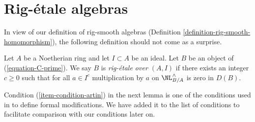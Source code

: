 \section{Rig-\'etale algebras}
\label{section-rig-etale}

\noindent
In view of our definition of rig-smooth algebras
(Definition \ref{definition-rig-smooth-homomorphism}),
the following definition should not come as a surprise.

\begin{definition}
\label{definition-rig-etale-homomorphism}
Let $A$ be a Noetherian ring and let $I \subset A$ be an ideal.
Let $B$ be an object of (\ref{equation-C-prime}). We say
$B$ is {\it rig-\'etale over $(A, I)$} if there exists an integer
$c \geq 0$ such that for all $a \in I^c$
multiplication by $a$ on $\NL_{B/A}^\wedge$
is zero in $D(B)$.
\end{definition}

\noindent
Condition (\ref{item-condition-artin}) in the next lemma is
one of the conditions used in \cite{ArtinII} to define formal modifications.
We have added it to the list of conditions to facilitate comparison
with our conditions later on.

